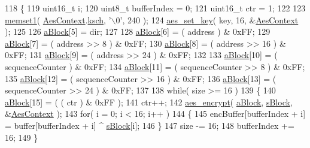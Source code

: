 \begin{DoxyCode}
118 \{
119     uint16\_t i;
120     uint8\_t bufferIndex = 0;
121     uint16\_t ctr = 1;
122 
123     \mbox{\hyperlink{utilities_8c_a272ed6d691263d9762c98ed720b1fa3a}{memset1}}( \mbox{\hyperlink{_lo_ra_mac_crypto_8c_a3bd634efd0dfb2a63534d8091949e208}{AesContext}}.\mbox{\hyperlink{structaes__context_a4a906db8aa15b44c3df5838cbd99cb1d}{ksch}}, \textcolor{charliteral}{'\(\backslash\)0'}, 240 );
124     \mbox{\hyperlink{aes_8c_a0ffc37ee1bbb50e7147bf6e7de5d73a1}{aes\_set\_key}}( key, 16, &\mbox{\hyperlink{_lo_ra_mac_crypto_8c_a3bd634efd0dfb2a63534d8091949e208}{AesContext}} );
125 
126     \mbox{\hyperlink{_lo_ra_mac_crypto_8c_abd9ef98e1c4826c3eae0aeb76c0b7629}{aBlock}}[5] = dir;
127 
128     \mbox{\hyperlink{_lo_ra_mac_crypto_8c_abd9ef98e1c4826c3eae0aeb76c0b7629}{aBlock}}[6] = ( address ) & 0xFF;
129     \mbox{\hyperlink{_lo_ra_mac_crypto_8c_abd9ef98e1c4826c3eae0aeb76c0b7629}{aBlock}}[7] = ( address >> 8 ) & 0xFF;
130     \mbox{\hyperlink{_lo_ra_mac_crypto_8c_abd9ef98e1c4826c3eae0aeb76c0b7629}{aBlock}}[8] = ( address >> 16 ) & 0xFF;
131     \mbox{\hyperlink{_lo_ra_mac_crypto_8c_abd9ef98e1c4826c3eae0aeb76c0b7629}{aBlock}}[9] = ( address >> 24 ) & 0xFF;
132 
133     \mbox{\hyperlink{_lo_ra_mac_crypto_8c_abd9ef98e1c4826c3eae0aeb76c0b7629}{aBlock}}[10] = ( sequenceCounter ) & 0xFF;
134     \mbox{\hyperlink{_lo_ra_mac_crypto_8c_abd9ef98e1c4826c3eae0aeb76c0b7629}{aBlock}}[11] = ( sequenceCounter >> 8 ) & 0xFF;
135     \mbox{\hyperlink{_lo_ra_mac_crypto_8c_abd9ef98e1c4826c3eae0aeb76c0b7629}{aBlock}}[12] = ( sequenceCounter >> 16 ) & 0xFF;
136     \mbox{\hyperlink{_lo_ra_mac_crypto_8c_abd9ef98e1c4826c3eae0aeb76c0b7629}{aBlock}}[13] = ( sequenceCounter >> 24 ) & 0xFF;
137 
138     \textcolor{keywordflow}{while}( size >= 16 )
139     \{
140         \mbox{\hyperlink{_lo_ra_mac_crypto_8c_abd9ef98e1c4826c3eae0aeb76c0b7629}{aBlock}}[15] = ( ( ctr ) & 0xFF );
141         ctr++;
142         \mbox{\hyperlink{aes_8c_ac88fd4e9cb53f78713a8fce1a6fcffc0}{aes\_encrypt}}( \mbox{\hyperlink{_lo_ra_mac_crypto_8c_abd9ef98e1c4826c3eae0aeb76c0b7629}{aBlock}}, \mbox{\hyperlink{_lo_ra_mac_crypto_8c_af3c68fef5488da81bfffbc456373746b}{sBlock}}, &\mbox{\hyperlink{_lo_ra_mac_crypto_8c_a3bd634efd0dfb2a63534d8091949e208}{AesContext}} );
143         \textcolor{keywordflow}{for}( i = 0; i < 16; i++ )
144         \{
145             encBuffer[bufferIndex + i] = buffer[bufferIndex + i] ^ \mbox{\hyperlink{_lo_ra_mac_crypto_8c_af3c68fef5488da81bfffbc456373746b}{sBlock}}[i];
146         \}
147         size -= 16;
148         bufferIndex += 16;
149     \}

\end{DoxyCode}
